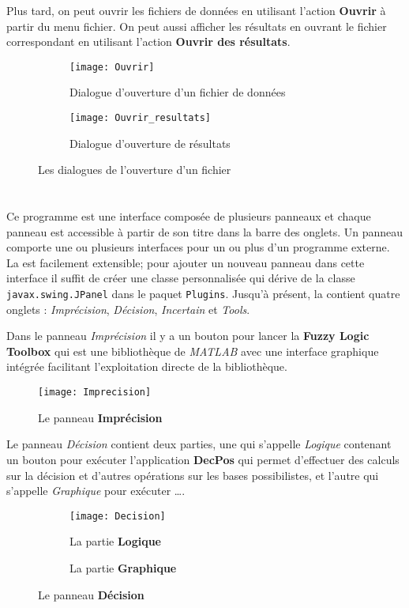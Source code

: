 Plus tard, on peut ouvrir les fichiers de données en utilisant l'action \textbf{Ouvrir} à partir du menu fichier. On
peut aussi afficher les résultats en ouvrant le fichier correspondant en utilisant l'action \textbf{Ouvrir des résultats}.

\begin{figure}[H]
\begin{subfigure}{0.49\textwidth}
\texttt{[image: Ouvrir]}
\caption{Dialogue d'ouverture d'un fichier de données}
\end{subfigure}
\hfill
\begin{subfigure}{0.49\textwidth}
\texttt{[image: Ouvrir\_resultats]}
\caption{Dialogue d'ouverture de résultats}
\end{subfigure}
\caption{Les dialogues de l'ouverture d'un fichier}
\end{figure}

\section{\platformeName}

Ce programme est une interface composée de plusieurs panneaux et chaque panneau est accessible
à partir de son titre dans la barre des onglets. Un panneau comporte une ou plusieurs interfaces pour
un ou plus d'un programme externe.  La \platformename est facilement extensible; pour ajouter un nouveau
panneau dans cette interface il suffit de créer une classe personnalisée qui dérive de la classe
\mbox{\texttt{javax.swing.JPanel}} dans le paquet \texttt{Plugins}. Jusqu'à présent, la \platformename
contient quatre onglets : \textit{Imprécision}, \textit{Décision}, \textit{Incertain}
et \textit{Tools}.

Dans le panneau \textit{Imprécision} il y a un bouton pour lancer la \textbf{Fuzzy Logic Toolbox} qui est une
bibliothèque de \textit{MATLAB} avec une interface graphique intégrée facilitant l'exploitation directe
de la bibliothèque.

\begin{figure}[H]
\centering
\texttt{[image: Imprecision]}
\caption{Le panneau \textbf{Imprécision}}
\end{figure}

Le panneau \textit{Décision} contient deux parties, une qui s'appelle \textit{Logique}
contenant un bouton pour exécuter l'application \textbf{DecPos} qui permet d'effectuer des calculs sur la
décision et d'autres opérations sur les bases possibilistes, et l'autre qui s'appelle \textit{Graphique} pour
exécuter \ldots.
\newsavebox{\screenshot}
\begin{figure}[H]
\begin{subfigure}{0.49\textwidth}
\texttt{[image: Decision]}
\caption{La partie \textbf{Logique}}
\end{subfigure}
\hfill
\begin{subfigure}{0.49\textwidth}
\fbox{\parbox[t][5.1cm][t]{\textwidth}{\hfill}}
\caption{La partie \textbf{Graphique}}
\end{subfigure}
\caption{Le panneau \textbf{Décision}}
\end{figure}


